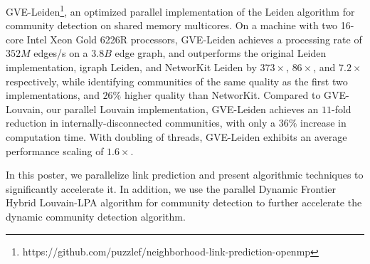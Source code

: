 GVE-Leiden\footnote{https://github.com/puzzlef/neighborhood-link-prediction-openmp}, an optimized parallel implementation of the Leiden algorithm for community detection on shared memory multicores. On a machine with two 16-core Intel Xeon Gold 6226R processors, GVE-Leiden achieves a processing rate of $352 M$ edges/s on a $3.8 B$ edge graph, and outperforms the original Leiden implementation, igraph Leiden, and NetworKit Leiden by $373\times$, $86\times$, and $7.2\times$ respectively, while identifying communities of the same quality as the first two implementations, and $26\%$ higher quality than NetworKit. Compared to GVE-Louvain, our parallel Louvain implementation, GVE-Leiden achieves an $11$-fold reduction in internally-disconnected communities, with only a $36\%$ increase in computation time. With doubling of threads, GVE-Leiden exhibits an average performance scaling of $1.6\times$.

In this poster, we parallelize link prediction and present algorithmic techniques to significantly accelerate it. In addition, we use the parallel Dynamic Frontier Hybrid Louvain-LPA algorithm for community detection to further accelerate the dynamic community detection algorithm.








